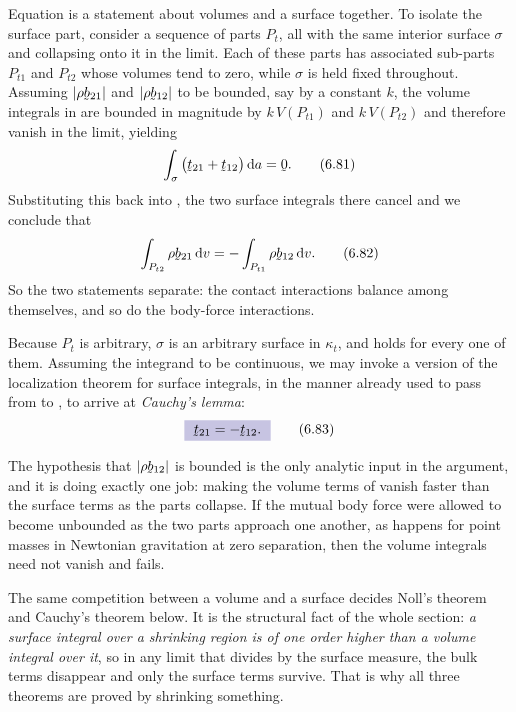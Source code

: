 Equation  is a statement about volumes and a surface
together. To isolate the surface part, consider a sequence of parts
$P_{t}$, all with the same interior surface $\sigma$ and collapsing
onto it in the limit. Each of these parts has associated sub-parts
$P_{t1}$ and $P_{t2}$ whose volumes tend to zero, while $\sigma$ is
held fixed throughout. Assuming $|\rho\bb_{21}|$ and $|\rho\bb_{12}|$
to be bounded, say by a constant $k$, the volume integrals in
 are bounded in magnitude by $k\,V(P_{t1})$ and
$k\,V(P_{t2})$ and therefore vanish in the limit, yielding
\begin{equation}
   \int_{\sigma}\big(\bt_{21}+\bt_{12}\big)\,\dl a=\bze .
   \tag{6.81}\label{eq:6.81}
\end{equation}
Substituting this back into , the two surface integrals there
cancel and we conclude that
\begin{equation}
   \int_{P_{t2}}\rho\bb_{21}\,\dl v=-\int_{P_{t1}}\rho\bb_{12}\,\dl v .
   \tag{6.82}\label{eq:6.82}
\end{equation}
So the two statements separate: the contact interactions balance among
themselves, and so do the body-force interactions.

Because $P_{t}$ is arbitrary, $\sigma$ is an arbitrary surface in
$\kappa_{t}$, and  holds for every one of them. Assuming the
integrand to be continuous, we may invoke a version of the localization
theorem for surface integrals, in the manner already used to pass from
 to , to arrive at \emph{Cauchy's lemma}:
\begin{equation}
   \boxed{\ \bt_{21}=-\bt_{12}.\ }
   \tag{6.83}\label{eq:6.83}
\end{equation}

\begin{remark}\label{rem:ch6bounded}
The hypothesis that $|\rho\bb_{12}|$ is bounded is the only analytic
input in the argument, and it is doing exactly one job: making the
volume terms of  vanish faster than the surface terms as the
parts collapse. If the mutual body force were allowed to become
unbounded as the two parts approach one another, as happens for point
masses in Newtonian gravitation at zero separation, then the volume
integrals need not vanish and  fails.

The same competition between a volume and a surface decides Noll's
theorem and Cauchy's theorem below. It is the structural fact of the
whole section: \emph{a surface integral over a shrinking region is of
one order higher than a volume integral over it}, so in any limit that
divides by the surface measure, the bulk terms disappear and only the
surface terms survive. That is why all three theorems are proved by
shrinking something.
\end{remark}


